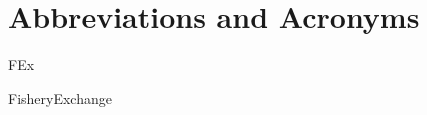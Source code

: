 \chapter{Abbreviations and Acronyms}\label{chapter:abbreviations}

\begin{multicols}{2}

	FEx

\columnbreak

	FisheryExchange

\end{multicols}

